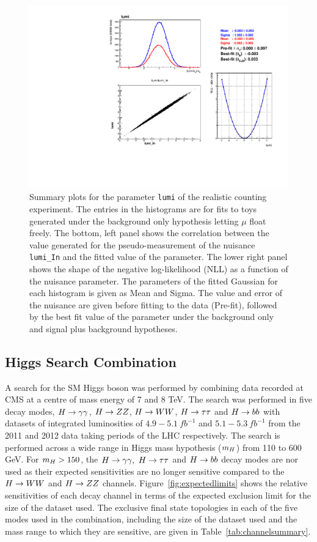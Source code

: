 \begin{figure}
  \begin{center}
    \includegraphics[width=\textwidth]{combinations/diagnostics/tree_fit_sb_lumi.pdf}
    \caption{Summary plots for the parameter \texttt{lumi} of the realistic counting experiment. 
	The entries in the histograms are for fits to toys generated under the background only
	hypothesis letting $\mu$ float freely. The bottom, left panel shows the correlation
	between the value generated for the pseudo-measurement of the nuisance 
	\texttt{lumi\_In} and the fitted value of the parameter. 
	The lower right panel shows the shape of the 
	negative log-likelihood (NLL) as a function of the nuisance parameter.
	The parameters of the fitted Gaussian for each histogram is given as 
	Mean and Sigma. The value and error of the nuisance are given before fitting
	to the data (Pre-fit), followed by the best fit value of the parameter 
	under the background only and signal plus background hypotheses.}
    \label{fig:real_lumi_s}
  \end{center}
\end{figure}

\subsection{Higgs Search Combination}
\label{combinedsearchresults}

A search for the SM Higgs boson was performed by combining data recorded at CMS 
at a centre of mass energy of 7 and 8 TeV. The search was performed in five
decay modes, $H\rightarrow\gamma\gamma$, $H\rightarrow ZZ$, $H\rightarrow WW$, $H\rightarrow\tau\tau$ and $H\rightarrow bb$ with datasets of
integrated luminosities of $4.9-5.1~fb^{-1}$ and $5.1-5.3~fb^{-1}$
from the 2011 and 2012 data taking periods of the LHC respectively.
The search is performed across a wide range in Higgs mass hypothesis ($m_{H}$) 
from 110 to 600 GeV. For $m_{H}>150$, the $H\rightarrow\gamma\gamma,~H\rightarrow\tau\tau$ and $H\rightarrow bb$ decay modes are nor used
as their expected sensitivities are no longer sensitive compared to the $H\rightarrow WW$ and
$H\rightarrow ZZ$ channels. Figure~\ref{fig:expectedlimits} shows the relative sensitivities of 
each decay channel in terms of the expected exclusion limit for the size of the dataset 
used. The exclusive final state topologies in each of the five modes used
in the combination, including the size of the dataset used and the mass range to
which they are sensitive, are given in Table~\ref{tab:channelsummary}.

